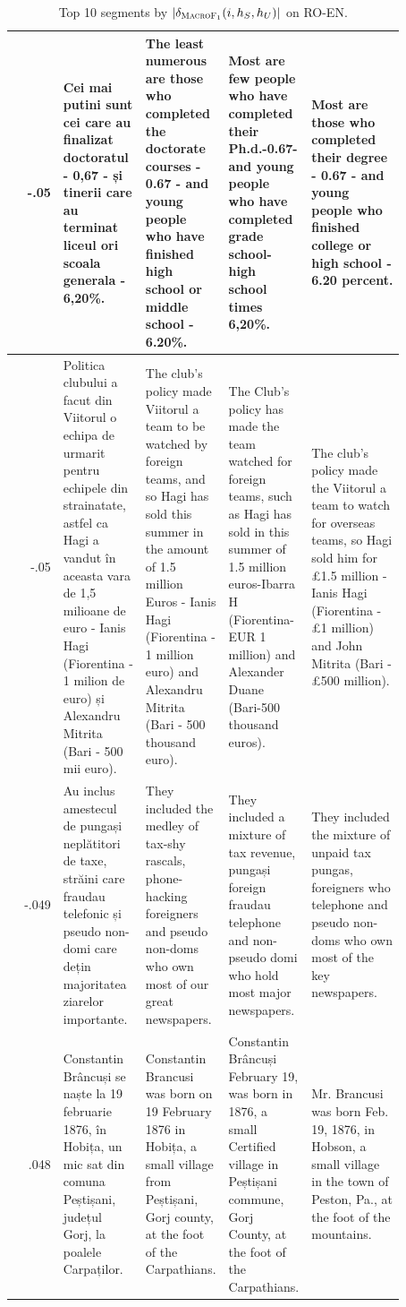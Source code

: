 \begin{table}[ht]
\begin{tabular}{r @{\hspace{1mm}} p{0.21\linewidth}p{0.21\linewidth}p{0.21\linewidth}p{0.24\linewidth}}
-.05 & Cei mai putini sunt cei care au finalizat doctoratul - 0,67 - și tinerii care au terminat liceul ori scoala generala - 6,20\%. & The least numerous are those who completed the doctorate courses - 0.67 - and young people who have finished high school or middle school - 6.20\%. & Most are few people who have completed their Ph.d.-0.67-and young people who have completed grade school-high school times 6,20\%. & Most are those who completed their degree - 0.67 - and young people who finished college or high school - 6.20 percent. \\\hline
-.05 & Politica clubului a facut din Viitorul o echipa de urmarit pentru echipele din strainatate, astfel ca Hagi a vandut în aceasta vara de 1,5 milioane de euro - Ianis Hagi (Fiorentina - 1 milion de euro) și Alexandru Mitrita (Bari - 500 mii euro). & The club's policy made Viitorul a team to be watched by foreign teams, and so Hagi has sold this summer in the amount of 1.5 million Euros - Ianis Hagi (Fiorentina - 1 million euro) and Alexandru Mitrita (Bari - 500 thousand euro). & The Club's policy has made the team watched for foreign teams, such as Hagi has sold in this summer of 1.5 million euros-Ibarra H (Fiorentina-EUR 1 million) and Alexander Duane (Bari-500 thousand euros). & The club's policy made the Viitorul a team to watch for overseas teams, so Hagi sold him for £1.5 million - Ianis Hagi (Fiorentina - £1 million) and John Mitrita (Bari - £500 million). \\\hline
-.049 & Au inclus amestecul de pungași neplătitori de taxe, străini care fraudau telefonic și pseudo non-domi care dețin majoritatea ziarelor importante. & They included the medley of tax-shy rascals, phone-hacking foreigners and pseudo non-doms who own most of our great newspapers. & They included a mixture of tax revenue, pungași foreign fraudau telephone and non-pseudo domi who hold most major newspapers. & They included the mixture of unpaid tax pungas, foreigners who telephone and pseudo non-doms who own most of the key newspapers. \\\hline
.048 & Constantin Brâncuși se naște la 19 februarie 1876, în Hobița, un mic sat din comuna Peștișani, județul Gorj, la poalele Carpaților. & Constantin Brancusi was born on 19 February 1876 in Hobița, a small village from Peștișani, Gorj county, at the foot of the Carpathians. & Constantin Brâncuși February 19, was born in 1876, a small Certified village in Peștișani commune, Gorj County, at the foot of the Carpathians. & Mr. Brancusi was born Feb. 19, 1876, in Hobson, a small village in the town of Peston, Pa., at the foot of the mountains. \\\hline
\end{tabular}
\caption{Top 10 segments by $|\delta_{\textsc{MacroF}{\text{$_{{1}}$}}}(i, h_S, h_U)|$ on RO-EN.}
\label{tab:maf1-top-10-roen}
\end{table}






